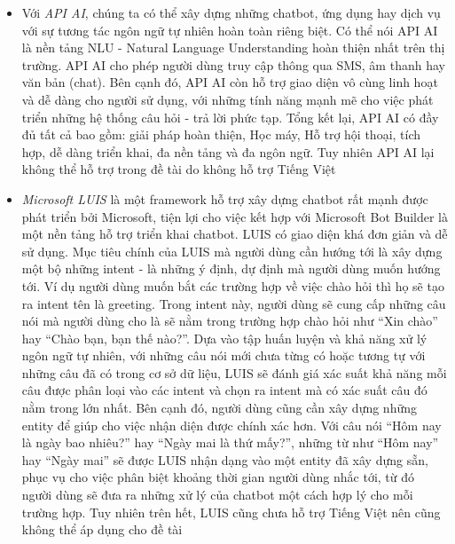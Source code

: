 \documentclass[12pt]{report}
\begin{document}
\begin{itemize}
	\item Với \textit{API AI}, chúng ta có thể xây dựng những chatbot, ứng dụng hay dịch vụ với sự tương tác ngôn ngữ tự nhiên hoàn toàn riêng biệt. Có thể nói API AI là nền tảng NLU - Natural Language Understanding hoàn thiện nhất trên thị trường. API AI cho phép người dùng truy cập thông qua SMS, âm thanh hay văn bản (chat). Bên cạnh đó, API AI còn hỗ trợ giao diện vô cùng linh hoạt và dễ dàng cho người sử dụng, với những tính năng mạnh mẽ cho việc phát triển những hệ thống câu hỏi - trả lời phức tạp. Tổng kết lại, API AI có đầy đủ tất cả bao gồm: giải pháp hoàn thiện, Học máy, Hỗ trợ hội thoại, tích hợp, dễ dàng triển khai, đa nền tảng và đa ngôn ngữ. Tuy nhiên API AI lại không thể hỗ trợ trong đề tài do không hỗ trợ Tiếng Việt
	\item \textit{Microsoft LUIS} là một framework hỗ trợ xây dựng chatbot rất mạnh được phát triển bởi Microsoft, tiện lợi cho việc kết hợp với Microsoft Bot Builder là một nền tảng hỗ trợ triển khai chatbot. LUIS có giao diện khá đơn giản và dễ sử dụng. Mục tiêu chính của LUIS mà người dùng cần hướng tới là xây dựng một bộ những intent - là những ý định, dự định mà người dùng muốn hướng tới. Ví dụ người dùng muốn bắt các trường hợp về việc chào hỏi thì họ sẽ tạo ra intent tên là greeting. Trong intent này, người dùng sẽ cung cấp những câu nói mà người dùng cho là sẽ nằm trong trường hợp chào hỏi như ``Xin chào'' hay ``Chào bạn, bạn thế nào?''. Dựa vào tập huấn luyện và khả năng xử lý ngôn ngữ tự nhiên, với những câu nói mới chưa từng có hoặc tương tự với những câu đã có trong cơ sở dữ liệu, LUIS sẽ đánh giá xác suất khả năng mỗi câu được phân loại vào các intent và chọn ra intent mà có xác suất câu đó nằm trong lớn nhất. Bên cạnh đó, người dùng cũng cần xây dựng những entity để giúp cho việc nhận diện được chính xác hơn. Với câu nói ``Hôm nay là ngày bao nhiêu?'' hay ``Ngày mai là thứ mấy?'', những từ như ``Hôm nay'' hay ``Ngày mai'' sẽ được LUIS nhận dạng vào một entity đã xây dựng sẵn, phục vụ cho việc phân biệt khoảng thời gian người dùng nhắc tới, từ đó người dùng sẽ đưa ra những xử lý của chatbot một cách hợp lý cho mỗi trường hợp. Tuy nhiên trên hết, LUIS cũng chưa hỗ trợ Tiếng Việt nên cũng không thể áp dụng cho đề tài
\end{itemize}
\end{document}
